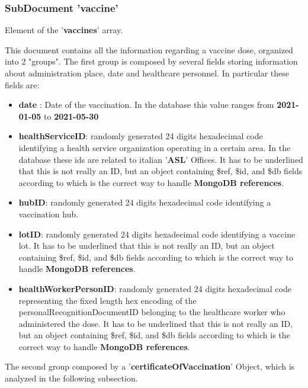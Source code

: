 \documentclass{article}[IEEEtran]
\begin{document}
\newpage
\subsubsection{SubDocument 'vaccine'}
Element of the '\textbf{vaccines}' array.

This document contains all the information regarding a vaccine dose, organized into 2 "groups".
The first group is composed by several fields storing information about administration place, date and healthcare personnel. 
In particular these fields are:

\begin{itemize}
    \item \textbf{date} : Date of the vaccination. In the database this value ranges from \textbf{2021-01-05} to \textbf{2021-05-30}
    
    \item \textbf{healthServiceID}: randomly generated 24 digits hexadecimal code identifying a health service organization operating in a certain area. In the database these ids are related to italian '\textbf{ASL}' Offices. It has to be underlined that this is not really an ID, but an object containing \$ref, \$id, and \$db fields according to which is the correct way to handle \textbf{MongoDB references}\cite{mongodbreferences}.
    
    \item \textbf{hubID}: randomly generated 24 digits hexadecimal code identifying a vaccination hub.
    
    \item \textbf{lotID}: randomly generated 24 digits hexadecimal code identifying a vaccine lot. It has to be underlined that this is not really an ID, but an object containing \$ref, \$id, and \$db fields according to which is the correct way to handle \textbf{MongoDB references}\cite{mongodbreferences}.
    
    \item \textbf{healthWorkerPersonID}: randomly generated 24 digits hexadecimal code representing the fixed length hex encoding of the personalRecognitionDocumentID belonging to the healthcare worker who administered the dose. It has to be underlined that this is not really an ID, but an object containing \$ref, \$id, and \$db fields according to which is the correct way to handle \textbf{MongoDB references}\cite{mongodbreferences}.
    
\end{itemize}

The second group composed by a '\textbf{certificateOfVaccination}' Object, which is analyzed in the following subsection.
\end{document}
